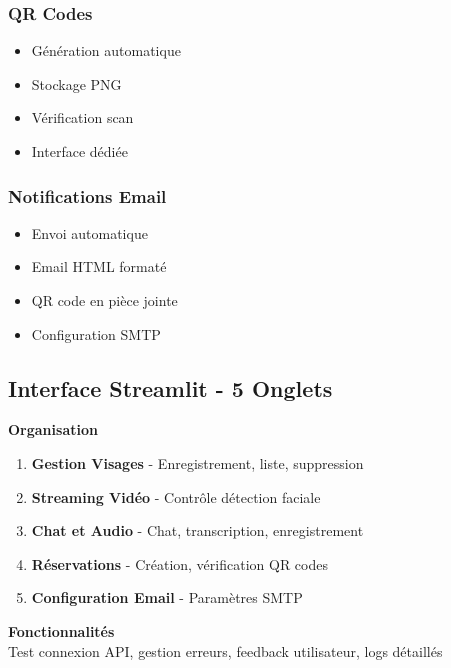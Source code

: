 \documentclass[12pt,a4paper]{article}
\newenvironment{block}[1]{\begin{center}\begin{minipage}{0.9\textwidth}\textbf{#1}\\}{\end{minipage}\end{center}}
\begin{document}
\subsubsection{QR Codes}
\begin{itemize}
    \item Génération automatique
    \item Stockage PNG
    \item Vérification scan
    \item Interface dédiée
\end{itemize}

\subsubsection{Notifications Email}
\begin{itemize}
    \item Envoi automatique
    \item Email HTML formaté
    \item QR code en pièce jointe
    \item Configuration SMTP
\end{itemize}

\subsection{Interface Streamlit - 5 Onglets}

\begin{block}{Organisation}
\begin{enumerate}
    \item \textcolor{primaryblue}{\faUser} \textbf{Gestion Visages} - Enregistrement, liste, suppression
    \item \textcolor{primaryblue}{\faVideo} \textbf{Streaming Vidéo} - Contrôle détection faciale
    \item \textcolor{primaryblue}{\faComments} \textbf{Chat et Audio} - Chat, transcription, enregistrement
    \item \textcolor{primaryblue}{\faBed} \textbf{Réservations} - Création, vérification QR codes
    \item \textcolor{primaryblue}{\faEnvelope} \textbf{Configuration Email} - Paramètres SMTP
\end{enumerate}
\end{block}

\begin{block}{Fonctionnalités}
Test connexion API, gestion erreurs, feedback utilisateur, logs détaillés
\end{block}
\end{document}

